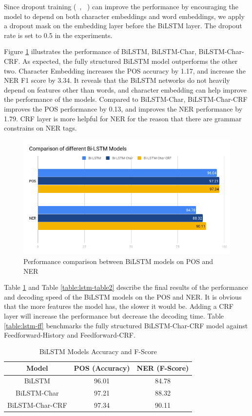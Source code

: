 \documentclass{sfuthesis}
\begin{document}
Since dropout training (~\citeauthor{hinton2012improving}, ~\citeyear{hinton2012improving}) can improve the performance by encouraging the model to depend on both character embeddings and word embeddings, we apply a dropout mask on the embedding layer before the BiLSTM layer. The dropout rate is set to 0.5 in the experiments.  

Figure \ref{fig:lstmbar} illustrates the performance of BiLSTM, BiLSTM-Char, BiLSTM-Char-CRF. As expected, the fully structured BiLSTM model outperforms the other two. Character Embedding increases the POS accuracy by 1.17, and increase the NER F1 score by 3.34. It reveals that the BiLSTM networks do not heavily depend on features other than words, and character embedding can help improve the performance of the models. Compared to BiLSTM-Char, BiLSTM-Char-CRF improves the POS performance by 0.13, and improves the NER performance by 1.79. CRF layer is more helpful for NER for the reason that there are grammar constrains on NER tags.

\begin{figure}
  \centering
  \includegraphics[scale=0.6]{lstmbar.png}
 \caption{Performance comparison between BiLSTM models on POS and NER}
  \label{fig:lstmbar}
\end{figure}

Table \ref{table:lstm-table1} and Table \ref{table:lstm-table2} describe the final results of the performance and decoding speed of the BiLSTM models on the POS and NER. It is obvious that the more features the model has, the slower it would be. Adding a CRF layer will increase the performance but decrease the decoding time. Table \ref{table:lstm-ff} benchmarks the fully structured BiLSTM-Char-CRF model against Feedforward-History and Feedforward-CRF. 

\begin{table}[]
\centering
\caption{BiLSTM Models Accuracy and F-Score}
\label{table:lstm-table1}
\begin{tabular}{|c|c|c|}
\hline
Model         & POS (Accuracy)  & NER (F-Score)       \\ \hline
BiLSTM  & 96.01     & 84.78                             \\ \hline
BiLSTM-Char & 97.21 & 88.32             \\ \hline
BiLSTM-Char-CRF & 97.34  & 90.11             \\ \hline
\end{tabular}
\end{table}
\end{document}
